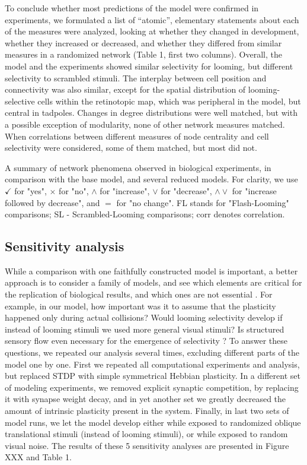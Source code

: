 \documentclass{article}
\begin{document}
To conclude whether most predictions of the model were confirmed in experiments, we formulated a list of “atomic”, elementary statements about each of the measures were analyzed, looking at whether they changed in development, whether they increased or decreased, and whether they differed from similar measures in a randomized network (Table 1, first two columns). Overall, the model and the experiments showed similar selectivity for looming, but different selectivity to scrambled stimuli. The interplay between cell position and connectivity was also similar, except for the spatial distribution of looming-selective cells within the retinotopic map, which was peripheral in the model, but central in tadpoles. Changes in degree distributions were well matched, but with a possible exception of modularity, none of other network measures matched. When correlations between different measures of node centrality and cell selectivity were considered, some of them matched, but most did not.

\begin{table}
    
    \caption{A summary of network phenomena observed in biological experiments, in comparison with the base model, and several reduced models. For clarity, we use $\checkmark$ for "yes", $\times$ for "no", $\land$ for "increase", $\lor$ for "decrease", $\land \lor$ for "increase followed by decrease", and $=$ for "no change". FL stands for "Flash-Looming" comparisons; SL - Scrambled-Looming comparisons; corr denotes correlation.}
\end{table}

\subsection*{Sensitivity analysis}

While a comparison with one faithfully constructed model is important, a better approach is to consider a family of models, and see which elements are critical for the replication of biological results, and which ones are not essential \citep{linderman2017constrain,pauli2018repro}. For example, in our model, how important was it to assume that the plasticity happened only during actual collisions? Would  looming selectivity develop if instead of looming stimuli we used more general visual stimuli? Is structured sensory flow even necessary for the emergence of selectivity \citep{triplett2018emergence}? To answer these questions, we repeated our analysis several times, excluding different parts of the model one by one. First we repeated all computational experiments and analysis, but replaced STDP with simple symmetrical Hebbian plasticity. In a different set of modeling experiments, we removed explicit synaptic competition, by replacing it with synapse weight decay, and in yet another set we greatly decreased the amount of intrinsic plasticity present in the system. Finally, in last two sets of model runs, we let the model develop either while exposed to randomized oblique translational stimuli (instead of looming stimuli), or while exposed to random visual noise. The results of these 5 sensitivity analyses are presented in Figure XXX and Table 1.
\end{document}
